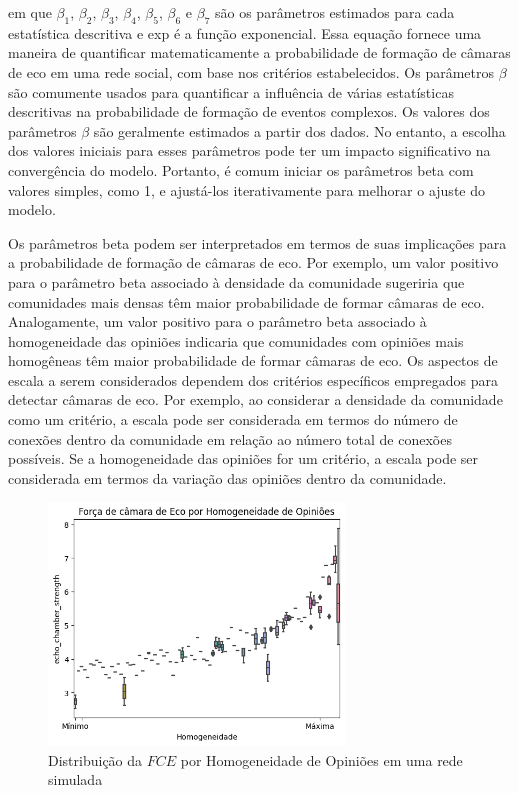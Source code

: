 em que $\beta_1$, $\beta_2$, $\beta_3$, $\beta_4$, $\beta_5$, $\beta_6$ e $\beta_7$ são os parâmetros estimados para cada estatística descritiva e exp é a função exponencial. Essa equação fornece uma maneira de quantificar matematicamente a probabilidade de formação de câmaras de eco em uma rede social, com base nos critérios estabelecidos. Os parâmetros $\beta$ são comumente usados para quantificar a influência de várias estatísticas descritivas na probabilidade de formação de eventos complexos. Os valores dos parâmetros $\beta$ são geralmente estimados a partir dos dados. No entanto, a escolha dos valores iniciais para esses parâmetros pode ter um impacto significativo na convergência do modelo. Portanto, é comum iniciar os parâmetros beta com valores simples, como 1, e ajustá-los iterativamente para melhorar o ajuste do modelo.

Os parâmetros beta podem ser interpretados em termos de suas implicações para a probabilidade de formação de câmaras de eco. Por exemplo, um valor positivo para o parâmetro beta associado à densidade da comunidade sugeriria que comunidades mais densas têm maior probabilidade de formar câmaras de eco. Analogamente, um valor positivo para o parâmetro beta associado à homogeneidade das opiniões indicaria que comunidades com opiniões mais homogêneas têm maior probabilidade de formar câmaras de eco. Os aspectos de escala a serem considerados dependem dos critérios específicos empregados para detectar câmaras de eco. Por exemplo, ao considerar a densidade da comunidade como um critério, a escala pode ser considerada em termos do número de conexões dentro da comunidade em relação ao número total de conexões possíveis. Se a homogeneidade das opiniões for um critério, a escala pode ser considerada em termos da variação das opiniões dentro da comunidade.

\begin{figure}[htb]
	\centering
	\includegraphics[width=0.7\textwidth]{images/echo_chamber_strength_by_homo.png}
	\caption{Distribuição da $FCE$ por Homogeneidade de Opiniões em uma rede simulada}
	\label{fig:echo_chamber_strength_by_homo}
\end{figure}

